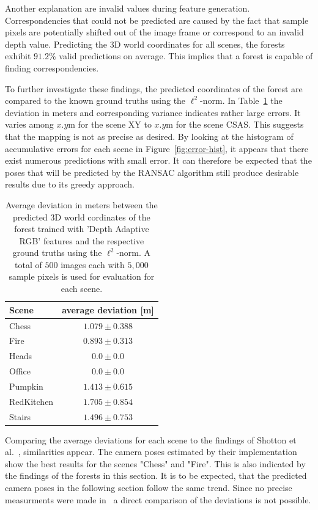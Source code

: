 \documentclass[final]{cvpr}
\begin{document}
Another explanation are invalid values during feature generation. Correspondencies that could not be predicted are
caused by the fact that sample pixels are potentially shifted out of the image frame or correspond to an invalid depth value. 
Predicting the 3D world coordinates for all scenes, the forests exhibit $91.2\%$ valid predictions on average. 
This implies that a forest is capable of finding correspondencies.

To further investigate these findings, the predicted coordinates of the forest are compared to the known ground truths using 
the $\ell^2$-norm. In Table~\ref{tab:forest-error} the deviation in meters and corresponding variance indicates rather large 
errors. It varies among $x.y$m for the scene XY to $x.y$m for the scene CSAS. This suggests that the mapping is not as precise
as desired. By looking at the histogram of accumulative errors for each scene in Figure~\ref{fig:error-hist}, it appears that 
there exist numerous predictions with small error. It can therefore be expected that the poses that will be predicted by the 
RANSAC algorithm still produce desirable results due to its greedy approach.  

\begin{table}[h]
	\begin{center}
	\begin{tabular}{|l|c|}
	\hline
	Scene & average deviation [m]\\
	\hline\hline
	Chess 		& 	$1.079 \pm 0.388$ \\
	Fire 		& 	$0.893 \pm 0.313$	\\
	Heads 		& 	$0.0 \pm 0.0$	\\
	Office 		&   $0.0 \pm 0.0$ \\
	Pumpkin 	& 	$1.413 \pm 0.615$ \\
	RedKitchen 	& 	$1.705 \pm 0.854$ \\
	Stairs 		& 	$1.496 \pm 0.753$ \\
	\hline
	\end{tabular}
	\end{center}
	\label{tab:forest-error}
	\caption{Average deviation in meters between the predicted 3D world cordinates of the forest trained with 
	'Depth Adaptive RGB' features and the respective ground truths using the $\ell^2$-norm. A total of
	$500$ images each with $5,000$ sample pixels is used for evaluation for each scene.}
\end{table}

Comparing the average deviations for each scene to the findings of Shotton et al.~\cite[Table 1]{shotton2013}, similarities appear.
The camera poses estimated by their implementation show the best results for the scenes "Chess" and "Fire". 
This is also indicated by the findings of the forests in this section. It is to be expected, that the predicted camera 
poses in the following section follow the same trend. Since no precise measurments were
made in~\cite{shotton2013} a direct comparison of the deviations is not possible.
\end{document}
